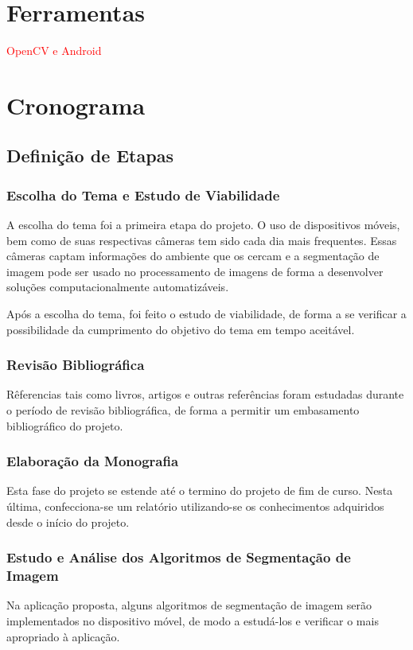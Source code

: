  


\chapter{Ferramentas}

\textcolor{red}{OpenCV e Android}


\chapter{Cronograma}
\section{Definição de Etapas}
\subsection{Escolha do Tema e Estudo de Viabilidade}
A escolha do tema foi a primeira etapa do projeto. O uso de dispositivos móveis, bem como de suas respectivas câmeras tem sido cada dia mais frequentes. Essas câmeras captam informações do ambiente que os cercam e a segmentação de imagem pode ser usado no processamento de imagens de forma a desenvolver soluções computacionalmente automatizáveis.

Após a escolha do tema, foi feito o estudo de viabilidade, de forma a se verificar a possibilidade da cumprimento do objetivo do tema em tempo aceitável.

\subsection{Revisão Bibliográfica}
Rêferencias tais como livros, artigos e outras referências foram estudadas durante o período de revisão bibliográfica, de forma a permitir um embasamento bibliográfico do projeto.

\subsection{Elaboração da Monografia}
Esta fase do projeto se estende até o termino do projeto de fim de curso. Nesta última, confecciona-se um relatório utilizando-se os conhecimentos adquiridos desde o início do projeto.

\subsection{Estudo e Análise dos Algoritmos de Segmentação de Imagem}
Na aplicação proposta, alguns algoritmos de segmentação de imagem serão implementados no dispositivo móvel, de modo a estudá-los e verificar o mais apropriado à aplicação.

